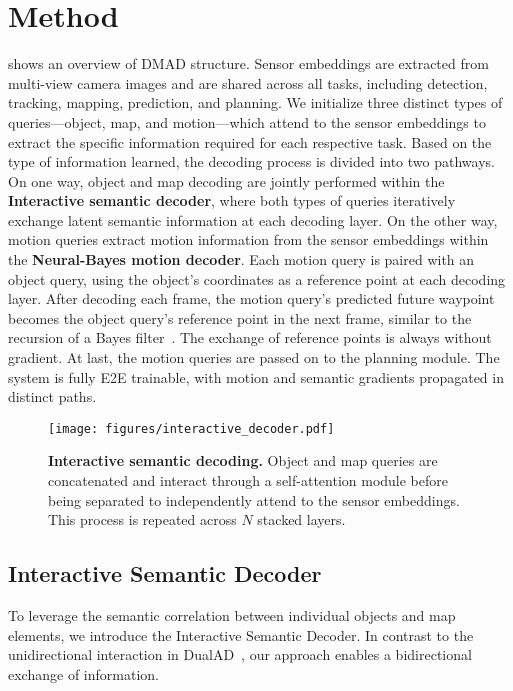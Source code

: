 \section{Method}
\label{sec:method}


 shows an overview of DMAD structure. Sensor embeddings are extracted from multi-view camera images and are shared across all tasks, including detection, tracking, mapping, prediction, and planning. We initialize three distinct types of queries—object, map, and motion—which attend to the sensor embeddings to extract the specific information required for each respective task. Based on the type of information learned, the decoding process is divided into two pathways. On one way, object and map decoding are jointly performed within the \textbf{Interactive semantic decoder}, where both types of queries iteratively exchange latent semantic information at each decoding layer. On the other way, motion queries extract motion information from the sensor embeddings within the \textbf{Neural-Bayes motion decoder}. Each motion query is paired with an object query, using the object’s coordinates as a reference point at each decoding layer. After decoding each frame, the motion query's predicted future waypoint becomes the object query's reference point in the next frame, similar to the recursion of a Bayes filter~\cite{thrun2005probabilistic}. The exchange of reference points is always without gradient. At last, the motion queries are passed on to the planning module. The system is fully \gls{E2E} trainable, with motion and semantic gradients propagated in distinct paths.

\begin{figure}[t]
    \centering
    \texttt{[image: figures/interactive\_decoder.pdf]}
    \caption{\textbf{Interactive semantic decoding.} Object and map queries are concatenated and interact through a self-attention module before being separated to independently attend to the sensor embeddings. This process is repeated across $N$ stacked layers.}
    \label{fig:interactive_decoder}
\end{figure}

\subsection{Interactive Semantic Decoder}
\label{sec:interactive_semantic_decoder}


To leverage the semantic correlation between individual objects and map elements, we introduce the Interactive Semantic Decoder. In contrast to the unidirectional interaction in \mbox{DualAD}~\cite{doll2024dualad}, our approach enables a bidirectional exchange of information.

